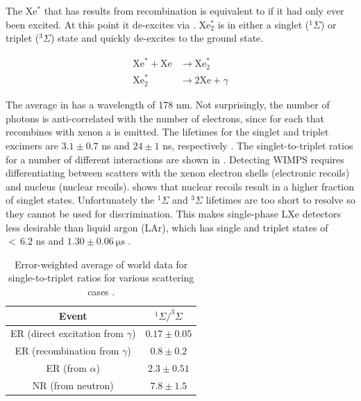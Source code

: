 The Xe$^{*}$ that has results from recombination is equivalent to if it had only ever been excited.  At this point
it de-excites via .  Xe$_{2}^{*}$ is in either a singlet
($^{1}\Sigma$) or triplet ($^{3}\Sigma$) state and quickly de-excites to the ground state.

\begin{subequations}
\begin{align}
\mathrm{Xe}^{*} + \mathrm{Xe} &\rightarrow \mathrm{Xe}_{2}^{*} \\
\mathrm{Xe}_{2}^{*} &\rightarrow 2\mathrm{Xe} + \gamma \label{eq:deexcite_gamma}
\end{align}
\label{eq:deexcite}
\end{subequations}

The average \gammaray in  has a wavelength of 178 nm.  Not surprisingly, the number of photons is
anti-correlated with the number of electrons, since for each \electron that
recombines with xenon a \gammaray is emitted.  The lifetimes for the singlet and triplet
excimers are $3.1 \pm 0.7$ ns and $24 \pm 1$ ns, respectively .  The singlet-to-triplet ratios for
a number of different interactions are shown in .  Detecting WIMPS requires differentiating between
scatters with the xenon electron shells (electronic recoils) and nucleus (nuclear recoils).   shows that
nuclear recoils result in a higher fraction of singlet states.  Unfortunately the $^1\Sigma$ and $^3\Sigma$ lifetimes
are too short to resolve so they cannot be used for discrimination.  This makes single-phase LXe detectors
less desirable than liquid argon (LAr), which has single and triplet states of ${<}\, 6.2$ ns and $1.30 \pm 0.06\ \mathrm{\mu s}$
.

\begin{table}[t]
 \centering
 \begin{tabular}{cc}
 \hline
 \hline
 Event & $^1\Sigma / ^3\Sigma$ \\
 \hline
 ER (direct excitation from $\gamma$) & $0.17 \pm 0.05$ \\
 ER (recombination from $\gamma$) & $0.8 \pm 0.2$ \\
 ER (from $\alpha$) & $2.3 \pm 0.51$ \\
 NR (from neutron) & $7.8 \pm 1.5$ \\
 \hline
 \hline
 \end{tabular}
 \caption{Error-weighted average of world data for single-to-triplet ratios for various scattering cases .}
\label{tab:singlet_to_triplet}
\end{table}

